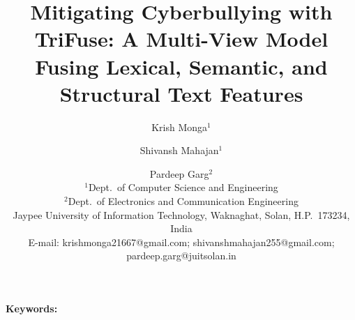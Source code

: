 \documentclass[11pt,a4paper]{article}
\title{Mitigating Cyberbullying with TriFuse: A Multi-View Model Fusing Lexical, Semantic, and Structural Text Features}
\author{Krish Monga$^{1}$ \and Shivansh Mahajan$^{1}$ \and Pardeep Garg$^{2}$\\[0.5em]
\small $^{1}$Dept.\ of Computer Science and Engineering\\
\small $^{2}$Dept.\ of Electronics and Communication Engineering\\
\small Jaypee University of Information Technology, Waknaghat, Solan, H.P.\ 173234, India\\
\small E-mail: krishmonga21667@gmail.com; shivanshmahajan255@gmail.com; pardeep.garg@juitsolan.in}
\date{}
\begin{document}
\maketitle
\begin{abstract}

\end{abstract}

\noindent\textbf{Keywords:} 




\end{document}
